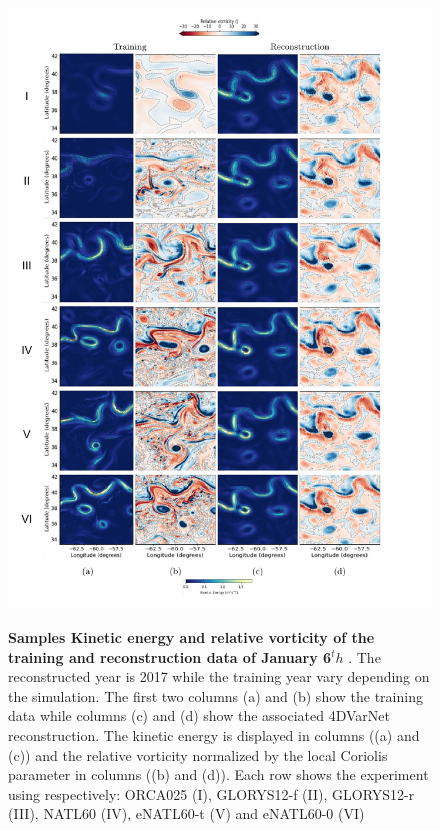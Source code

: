 \begin{bibunit}
\begin{figure}[H]
\small

\begin{center}

\includegraphics[width=\linewidth]{./00_Simulearning/standalone_figures/maps.pdf}

\caption{\textbf{Samples 
Kinetic energy and relative vorticity of the training and reconstruction data of January 6$^th$ }.
The reconstructed year is 2017 while the training year vary depending on the simulation.
The first two columns (a) and (b) show the training data while columns (c) and (d) show the associated 4DVarNet reconstruction.
The kinetic energy is displayed in columns ((a) and (c)) and the relative vorticity normalized by the local Coriolis parameter in columns ((b) and (d)).
Each row shows the experiment using respectively: ORCA025 (I), GLORYS12-f (II), GLORYS12-r (III), NATL60 (IV), eNATL60-t (V) and eNATL60-0 (VI)}
\vspace{-5mm}
\label{c4fig:maps}
\end{center}
\end{figure}




\end{bibunit}
